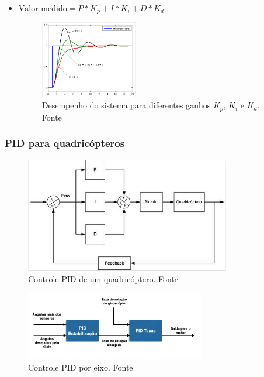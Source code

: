 \documentclass{beamer}
\begin{document}
\begin{frame}[allowframebreaks]
\begin{itemize}
		\item $ \mbox{Valor medido} = P*K_p + I*K_i + D*K_d$
		
		\vspace{0.6cm}
		\begin{figure}[h]
			\centering
			\includegraphics[keepaspectratio = true,
			width=0.4\textwidth]{img/ganho_PID.png}
			\caption{Desempenho do sistema para diferentes ganhos $K_p$, $K_i$ e $K_d$. Fonte \cite{Kingdom}}
			\label{fig:ganhoPID}
		\end{figure}	
	
	\end{itemize}
	
\end{frame}	

\begin{frame}[allowframebreaks]
	
	\frametitle{PID para quadricópteros}
	
	\begin{figure}[h]
		\centering
		\includegraphics[keepaspectratio = true,
		width=0.8\textwidth]{img/PID_quad_geral.png}
		\caption{Controle PID de um quadricóptero. Fonte \cite{Liang}}
		\label{fig:PIDquad}
	\end{figure}
	
	\framebreak
	
	\begin{figure}[h]
		\centering
		\includegraphics[keepaspectratio = true,
		width=0.7\textwidth]{img/PID_quad_axis.png}
		\caption{Controle PID por eixo. Fonte \cite{Liang}}
		\label{fig:PIDaxis}
	\end{figure}
	
	
\end{frame}	
\end{document}

